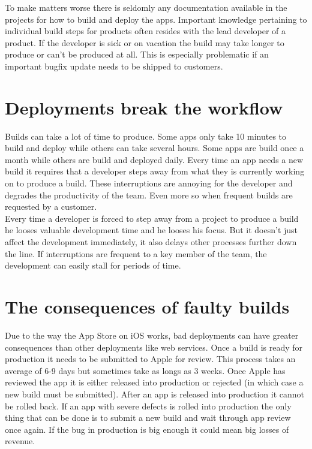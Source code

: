 \documentclass{ituthesis}
\begin{document}
To make matters worse there is seldomly any documentation available in the projects for how to build and deploy the apps. Important knowledge pertaining to individual build steps for products often resides with the lead developer of a product. If the developer is sick or on vacation the build may take longer to produce or can't be produced at all. This is especially problematic if an important bugfix update needs to be shipped to customers.  

\section{Deployments break the workflow}

Builds can take a lot of time to produce. Some apps only take 10 minutes to build and deploy while others can take several hours. Some apps are build once a month while others are build and deployed daily. Every time an app needs a new build it requires that a developer steps away from what they is currently working on to produce a build. These interruptions are annoying for the developer and degrades the productivity of the team. Even more so when frequent builds are requested by a customer.\\

Every time a developer is forced to step away from a project to produce a build he looses valuable development time and he looses his focus. But it doesn't just affect the development immediately, it also delays other processes further down the line. If interruptions are frequent to a key member of the team, the development can easily stall for periods of time.

\section{The consequences of faulty builds}
\label{sec:consequences_of_faulty_builds}

Due to the way the App Store on iOS works, bad deployments can have greater consequences than other deployments like web services. Once a build is ready for production it needs to be submitted to Apple for review. This process takes an average of 6-9 days but sometimes take as longs as 3 weeks. Once Apple has reviewed the app it is either released into production or rejected (in which case a new build must be submitted). After an app is released into production it cannot be rolled back. If an app with severe defects is rolled into production the only thing that can be done is to submit a new build and wait through app review once again. If the bug in production is big enough it could mean big losses of revenue.\\
\end{document}
